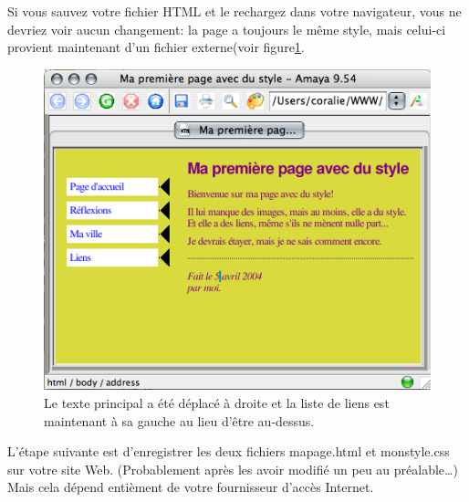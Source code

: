 Si vous sauvez votre fichier HTML et le rechargez dans votre navigateur, vous ne devriez voir aucun changement: la page a toujours le même style, mais celui-ci provient maintenant d'un fichier externe(voir figure\ref{fig:screen6}. 
\begin{figure}[t]
	\begin{center}
		\includegraphics{voronin/img/capture5.png}
		\caption{Le texte principal a été déplacé à droite et la liste de liens est maintenant à sa gauche au lieu d'être au-dessus. }
		\label{fig:screen6}	
	\end{center}
\end{figure}
L'étape suivante est d'enregistrer les deux fichiers mapage.html et monstyle.css sur votre site Web. (Probablement après les avoir modifié un peu au préalable…) Mais cela dépend entièment de votre fournisseur d'accès Internet. 




